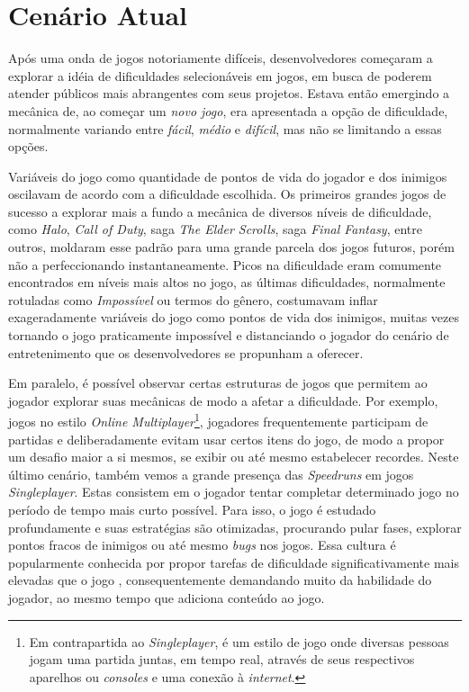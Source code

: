 \section{Cenário Atual}

Após uma onda de jogos notoriamente difíceis, desenvolvedores começaram a explorar a idéia de dificuldades selecionáveis em jogos, em busca de poderem atender públicos mais abrangentes com seus projetos. Estava então emergindo a mecânica de, ao começar um \textit{novo jogo}, era apresentada a opção de dificuldade, normalmente variando entre \textit{fácil}, \textit{médio} e \textit{difícil}, mas não se limitando a essas opções.

Variáveis do jogo como quantidade de pontos de vida do jogador e dos inimigos oscilavam de acordo com a dificuldade escolhida. Os primeiros grandes jogos de sucesso a explorar mais a fundo a mecânica de diversos níveis de dificuldade, como \textit{Halo}, \textit{Call of Duty}, saga \textit{The Elder Scrolls}, saga \textit{Final Fantasy}, entre outros, moldaram esse padrão para uma grande parcela dos jogos futuros, porém não a perfeccionando instantaneamente. Picos na dificuldade eram comumente encontrados em níveis mais altos no jogo, as últimas dificuldades, normalmente rotuladas como \textit{Impossível} ou termos do gênero, costumavam inflar exageradamente variáveis do jogo como pontos de vida dos inimigos, muitas vezes tornando o jogo praticamente impossível e distanciando o jogador do cenário de entretenimento que os desenvolvedores se propunham a oferecer.

Em paralelo, é possível observar certas estruturas de jogos que permitem ao jogador explorar suas mecânicas de modo a afetar a dificuldade. Por exemplo, jogos no estilo \textit{Online Multiplayer}\footnote{
    Em contrapartida ao \textit{Singleplayer}, é um estilo de jogo onde diversas pessoas jogam uma partida juntas, em tempo real, através de seus respectivos aparelhos ou \textit{consoles} e uma conexão à \textit{internet}.
}, jogadores frequentemente participam de partidas e deliberadamente evitam usar certos itens do jogo, de modo a propor um desafio maior a si mesmos, se exibir ou até mesmo estabelecer recordes. Neste último cenário, também vemos a grande presença das \textit{Speedruns} em jogos \textit{Singleplayer}. Estas consistem em o jogador tentar completar determinado jogo no período de tempo mais curto possível. Para isso, o jogo é estudado profundamente e suas estratégias são otimizadas, procurando pular fases, explorar pontos fracos de inimigos ou até mesmo \textit{bugs} nos jogos. Essa cultura é popularmente conhecida por propor tarefas de dificuldade significativamente mais elevadas que o jogo \textquotedbl{}, consequentemente demandando muito da habilidade do jogador, ao mesmo tempo que adiciona conteúdo ao jogo.

